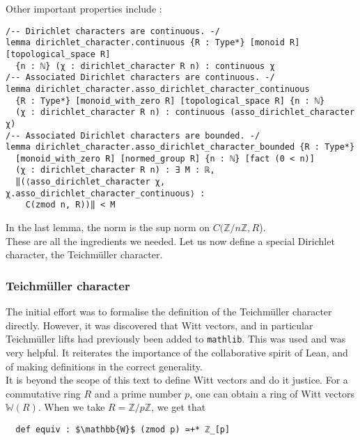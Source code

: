 \documentclass[a4paper,UKenglish,cleveref, autoref, thm-restate]{lipics-v2021}
\newcommand{\lean}[1]{\texttt{#1}\xspace} %
\begin{document}
Other important properties include : 
\begin{lstlisting}
/-- Dirichlet characters are continuous. -/
lemma dirichlet_character.continuous {R : Type*} [monoid R] [topological_space R]
  {n : ℕ} (χ : dirichlet_character R n) : continuous χ
/-- Associated Dirichlet characters are continuous. -/
lemma dirichlet_character.asso_dirichlet_character_continuous
  {R : Type*} [monoid_with_zero R] [topological_space R] {n : ℕ} 
  (χ : dirichlet_character R n) : continuous (asso_dirichlet_character χ) 
/-- Associated Dirichlet characters are bounded. -/
lemma dirichlet_character.asso_dirichlet_character_bounded {R : Type*} 
  [monoid_with_zero R] [normed_group R] {n : ℕ} [fact (0 < n)] 
  (χ : dirichlet_character R n) : ∃ M : ℝ,
  ‖(⟨asso_dirichlet_character χ, χ.asso_dirichlet_character_continuous⟩ : 
    C(zmod n, R))‖ < M 
\end{lstlisting}

In the last lemma, the norm is the sup norm on $C(\mathbb{Z}/n \mathbb{Z}, R$). \\
These are all the ingredients we needed. Let us now define a special Dirichlet character, the Teichmüller character.

\subsubsection{Teichmüller character}
The initial effort was to formalise the definition of the Teichmüller character directly. 
However, it was discovered that Witt vectors, and in particular Teichmüller lifts had previously 
been added to \lean{mathlib}. This was used and was very helpful. It reiterates the importance 
of the collaborative spirit of Lean, and of making definitions in the correct generality. \\

It is beyond the scope of this text to define Witt vectors and do it justice. For a commutative ring
$R$ and a prime number $p$, one can obtain a ring of Witt vectors $\mathbb{W}(R)$.
When we take $R = \mathbb{Z}/p \mathbb{Z}$, we get that

\begin{lstlisting}
  def equiv : $\mathbb{W}$ (zmod p) ≃+* ℤ_[p]
\end{lstlisting}
\end{document}
